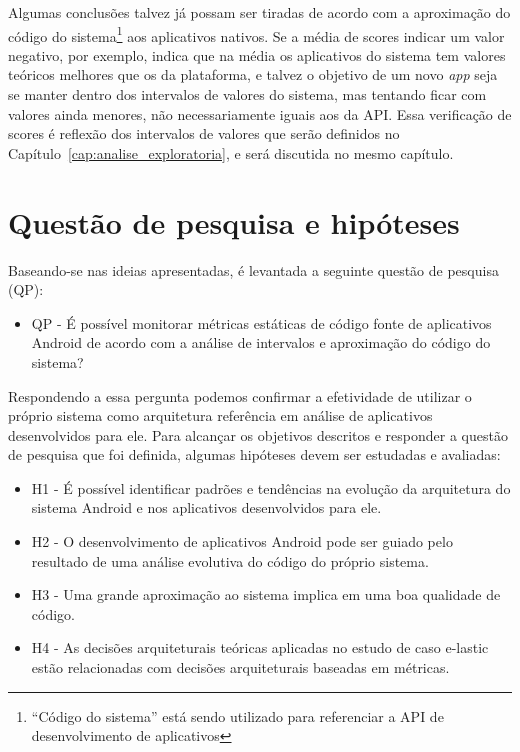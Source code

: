 Algumas conclusões talvez já possam ser tiradas de acordo com a aproximação do código do sistema\footnote{``Código do sistema'' está sendo utilizado para referenciar a API de desenvolvimento de aplicativos} aos aplicativos nativos. Se a média de scores indicar um valor negativo, por exemplo, indica que na média os aplicativos do sistema tem valores teóricos melhores que os da plataforma, e talvez o objetivo de um novo \textit{app} seja se manter dentro dos intervalos de valores do sistema, mas tentando ficar com valores ainda menores, não necessariamente iguais aos da API. Essa verificação de scores é reflexão dos intervalos de valores que serão definidos no Capítulo~\ref{cap:analise_exploratoria}, e será discutida no mesmo capítulo.

\section{Questão de pesquisa e hipóteses}

Baseando-se nas ideias apresentadas, é levantada a seguinte questão de pesquisa (QP):

\begin{itemize}
\item QP - É possível monitorar métricas estáticas de código fonte de aplicativos Android de acordo com a análise de intervalos e aproximação do código do sistema?
\end{itemize}

Respondendo a essa pergunta podemos confirmar a efetividade de utilizar o próprio sistema como arquitetura referência em análise de aplicativos desenvolvidos para ele. Para alcançar os objetivos descritos e responder a questão de pesquisa que foi definida, algumas hipóteses devem ser estudadas e avaliadas:

\begin{itemize}
\item H1 - É possível identificar padrões e tendências na evolução da arquitetura do sistema Android e nos aplicativos desenvolvidos para ele.
\item H2 - O desenvolvimento de aplicativos Android pode ser guiado pelo resultado de uma análise evolutiva do código do próprio sistema.
\item H3 - Uma grande aproximação ao sistema implica em uma boa qualidade de código.
\item H4 - As decisões arquiteturais teóricas aplicadas no estudo de caso e-lastic estão relacionadas com decisões arquiteturais baseadas em métricas.
\end{itemize}

